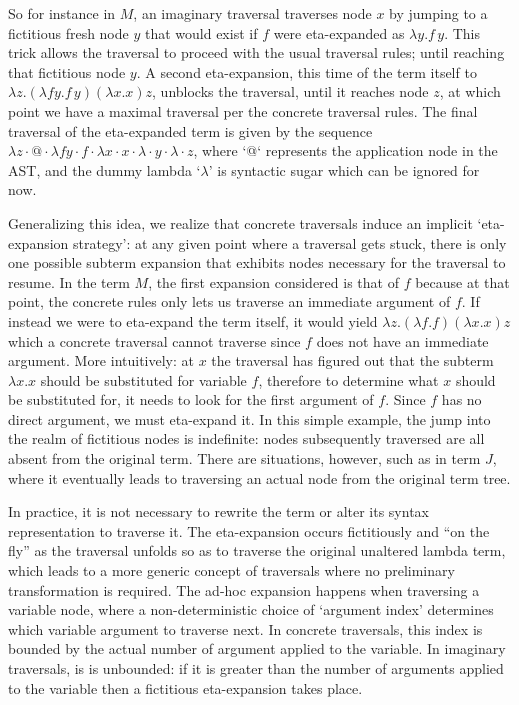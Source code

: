 \documentclass{elsarticle}
\theoremstyle{plain}
\theoremstyle{definition}
\theoremstyle{remark}
\begin{document}
So for instance in $M$, an imaginary traversal traverses node $x$ by jumping to a fictitious fresh node $y$ that would exist if $f$ were eta-expanded
as $\lambda y.f\, y$. This trick allows the traversal to proceed with the usual traversal rules; until reaching that fictitious node $y$.
A second eta-expansion, this time of the term itself to
$\lambda z. (\lambda f y.f\, y)(\lambda x.x) z$,
unblocks the traversal, until it reaches node $z$, at which point we have a maximal traversal per the concrete traversal rules. The final traversal of the eta-expanded term is given by the sequence $\lambda z \cdot @ \cdot \lambda f y \cdot f \cdot \lambda x \cdot x \cdot \lambda \cdot y \cdot \lambda \cdot z$, where `@` represents the application node in the AST, and the dummy lambda `$\lambda$' is syntactic sugar which can be ignored for now.

Generalizing this idea, we realize that concrete traversals induce an implicit `eta-expansion strategy': at any given point where a traversal gets stuck, there is only one possible subterm expansion that exhibits nodes necessary for the traversal to resume. In the term $M$, the first expansion considered is that of $f$ because at that point, the concrete rules only lets us
traverse an immediate argument of $f$. If instead we were to eta-expand the term itself, it would yield $\lambda z. (\lambda f .f)(\lambda x.x) z$
which a concrete traversal cannot traverse since $f$ does not have an immediate argument. More intuitively: at $x$ the traversal has figured out that the subterm $\lambda x.x$ should be substituted for variable $f$, therefore to determine what $x$ should be substituted for, it needs to look for the first argument of $f$. Since $f$ has no direct argument, we must eta-expand it. In this simple example, the jump into the realm of fictitious nodes is indefinite: nodes subsequently traversed are all absent from the original term. There are situations, however, such as in term $J$, where it eventually leads to traversing an actual node from the original term tree.

In practice, it is not necessary to rewrite the term or alter its syntax representation to traverse it.
The eta-expansion occurs fictitiously and ``on the fly'' as the traversal unfolds so as to traverse the original unaltered lambda term, which leads to a more generic concept of traversals where no preliminary transformation is required.
%
The ad-hoc expansion happens when traversing a variable node, where a non-deterministic choice of `argument index' determines which variable argument to traverse next. In concrete traversals, this index is bounded by the actual number of argument applied to the variable. In imaginary traversals, is is unbounded: if it is greater than the number of arguments applied to the variable then a fictitious eta-expansion takes place.
\end{document}
